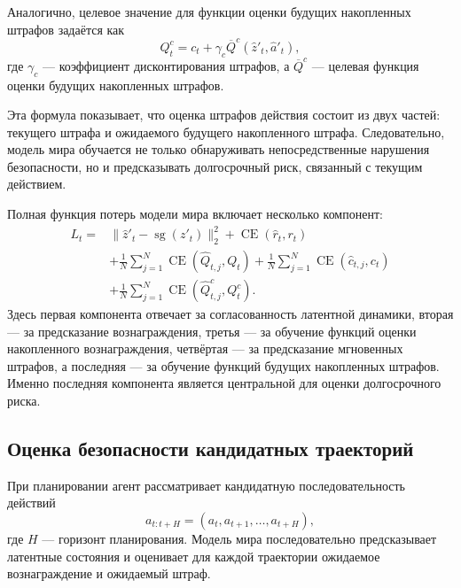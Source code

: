 Аналогично, целевое значение для функции оценки будущих накопленных штрафов задаётся как
\begin{equation}
    Q^c_t = c_t + \gamma_c \overline{Q}^c(\hat{z}'_t, \hat{a}'_t),
\end{equation}
где $\gamma_c$ --- коэффициент дисконтирования штрафов, а $\overline{Q}^c$ --- целевая функция оценки будущих накопленных штрафов.

Эта формула показывает, что оценка штрафов действия состоит из двух частей: текущего штрафа и ожидаемого будущего накопленного штрафа. Следовательно, модель мира обучается не только обнаруживать непосредственные нарушения безопасности, но и предсказывать долгосрочный риск, связанный с текущим действием.

Полная функция потерь модели мира включает несколько компонент:
\begin{equation}
    \begin{aligned}
        L_t ={} &
        \|\hat{z}'_t - \operatorname{sg}(z'_t)\|^2_2
        + \operatorname{CE}(\hat{r}_t, r_t) \\
        &+ \frac{1}{N}\sum_{j=1}^{N}\operatorname{CE}(\hat{Q}_{t,j}, Q_t)
        + \frac{1}{N}\sum_{j=1}^{N}\operatorname{CE}(\hat{c}_{t,j}, c_t) \\
        &+ \frac{1}{N}\sum_{j=1}^{N}\operatorname{CE}(\hat{Q}^c_{t,j}, Q^c_t).
    \end{aligned}
\end{equation}
Здесь первая компонента отвечает за согласованность латентной динамики, вторая --- за предсказание вознаграждения, третья --- за обучение функций оценки накопленного вознаграждения, четвёртая --- за предсказание мгновенных штрафов, а последняя --- за обучение функций будущих накопленных штрафов. Именно последняя компонента является центральной для оценки долгосрочного риска.

\subsection{Оценка безопасности кандидатных траекторий}
\label{subsec:trajectory_cost_eval}

При планировании агент рассматривает кандидатную последовательность действий
\begin{equation}
    a_{t:t+H} = (a_t, a_{t+1}, \ldots, a_{t+H}),
\end{equation}
где $H$ --- горизонт планирования. Модель мира последовательно предсказывает латентные состояния и оценивает для каждой траектории ожидаемое вознаграждение и ожидаемый штраф.

